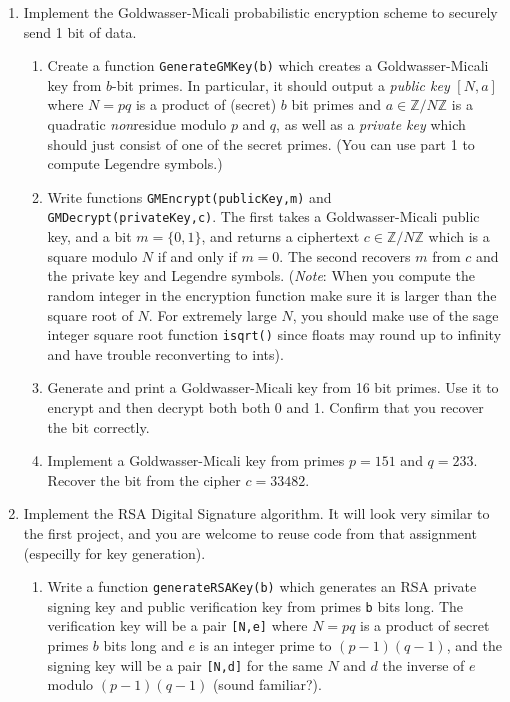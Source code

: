 \documentclass[11pt]{article}
\newcommand{\bZ}{\mathbb{Z}}
\begin{document}
\begin{enumerate}
{\begin{enumerate}
{    }
  \end{enumerate}
  }
  \item{
  Implement the Goldwasser-Micali probabilistic encryption scheme to securely send 1 bit of data.
  \begin{enumerate}
    \item{
    Create a function \verb|GenerateGMKey(b)| which creates a Goldwasser-Micali key from $b$-bit primes.  In particular, it should output a \textit{public key} $[N,a]$ where $N = pq$ is a product of (secret) $b$ bit primes and $a\in\bZ/N\bZ$ is a quadratic \textit{non}residue modulo $p$ and $q$, as well as a \textit{private key} which should just consist of one of the secret primes.  (You can use part 1 to compute Legendre symbols.)
    }
    \item{
    Write functions \verb|GMEncrypt(publicKey,m)| and \verb|GMDecrypt(privateKey,c)|.  The first takes a Goldwasser-Micali public key, and a bit $m = \{0,1\}$, and returns a ciphertext $c\in\bZ/N\bZ$ which is a square modulo $N$ if and only if $m=0$. The second recovers $m$ from $c$ and the private key and Legendre symbols.  (\textit{Note}: When you compute the random integer in the encryption function make sure it is larger than the square root of $N$.  For extremely large $N$, you should make use of the sage integer square root function \verb|isqrt()| since floats may round up to infinity and have trouble reconverting to ints).
    }
    \item{
    Generate and print a Goldwasser-Micali key from 16 bit primes.  Use it to encrypt and then decrypt both both 0 and 1.  Confirm that you recover the bit correctly.
    }
    \item{
    Implement a Goldwasser-Micali key from primes $p=151$ and $q=233$.  Recover the bit from the cipher $c = 33482$.
    }
  \end{enumerate}
  }
  \item{
  Implement the RSA Digital Signature algorithm.  It will look very similar to the first project, and you are welcome to reuse code from that assignment (especilly for key generation).
  \begin{enumerate}
    \item{
    Write a function \verb|generateRSAKey(b)| which generates an RSA private signing key and public verification key from primes \verb|b| bits long.  The verification key will be a pair \verb|[N,e]| where $N = pq$ is a product of secret primes $b$ bits long and $e$ is an integer prime to $(p-1)(q-1)$, and the signing key will be a pair \verb|[N,d]| for the same $N$ and $d$ the inverse of $e$ modulo $(p-1)(q-1)$ (sound familiar?).
}
\end{enumerate}}
\end{enumerate}
\end{document}
